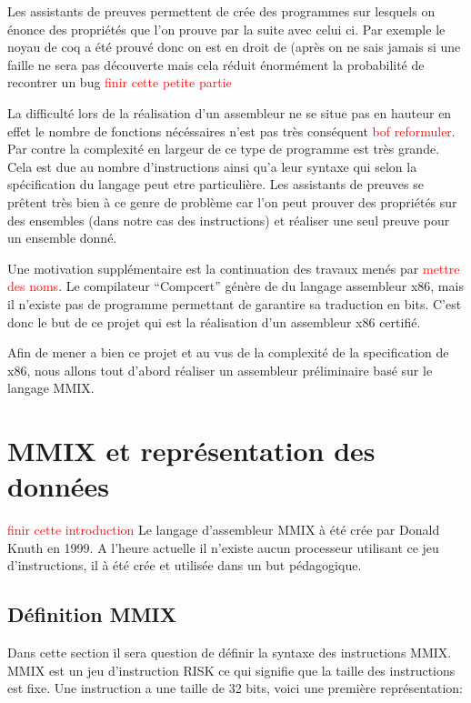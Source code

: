 \documentclass {article}
\theoremstyle{definition}
\theoremstyle{remark}
\newcommand{\todo}[1]{\textcolor{red}{#1}}
\begin{document}
Les assistants de preuves permettent de crée des programmes sur lesquels on énonce des propriétés que l'on prouve par
la suite avec celui ci. 
Par exemple le noyau de coq a été prouvé donc on est en droit de (après on ne sais jamais si une faille ne sera pas découverte
mais cela réduit énormément la probabilité de recontrer un bug \todo{finir cette petite partie}

La difficulté lors de la réalisation d'un assembleur ne se situe pas en hauteur en effet le nombre de
fonctions nécéssaires n'est pas très conséquent \todo{bof reformuler}. Par contre la complexité en largeur
de ce type de programme est très grande. Cela est due au nombre d'instructions ainsi qu'a leur syntaxe qui selon
la spécification du langage peut etre particulière.
Les assistants de preuves se prêtent très bien à ce genre de problème car l'on peut prouver des
propriétés sur des ensembles (dans notre cas des instructions) et réaliser une seul preuve pour
un ensemble donné.

Une motivation supplémentaire est la continuation des travaux menés par \todo{mettre des noms}.
Le compilateur ``Compcert'' génère de du langage assembleur x86, mais il n'existe pas
de programme permettant de garantire sa traduction en bits.
C'est donc le but de ce projet qui est la réalisation d'un assembleur x86 certifié.

Afin de mener a bien ce projet et au vus de la complexité de la specification de x86,
nous allons tout d'abord réaliser un assembleur préliminaire basé sur le langage MMIX.




\section{MMIX et représentation des données}
\label{partieMMIX}

\todo{finir cette introduction}
Le langage d'assembleur MMIX à été crée par Donald Knuth en 1999.
A l'heure actuelle il n'existe aucun processeur utilisant ce jeu d'instructions, il
à été crée et utilisée dans un but pédagogique.



\subsection{Définition MMIX}

Dans cette section il sera question de définir la syntaxe des instructions MMIX.
MMIX est un jeu d'instruction RISK ce qui signifie que la taille des instructions
est fixe. Une instruction a une taille de 32 bits, voici une première représentation:
\end{document}

